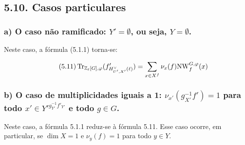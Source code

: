 \subsection*{5.10. Casos particulares}
\subsubsection*{a) O caso não ramificado: $Y' = \emptyset$, ou seja, $Y = \emptyset$.}

Neste caso, a fórmula (5.1.1) torna-se:

\begin{equation}\tag{5.11}
\operatorname{Tr}_{\mathbb Z_\ell[G],\varphi}(f'_{H^\vee_{U',X'}(\ell)}) = \sum_{x \in X^f} \nu_x(f) \mathrm{NW}_f^{G,\varphi}(x)
\end{equation}

\subsubsection*{b) O caso de multiplicidades iguais a 1: $\nu_{x'}(g_{X'}^{-1}f') = 1$ para todo $x'\in {Y'}^{g_{Y'}^{-1}f'_{Y'}}$ e todo $g\in G$.}

Neste caso, a fórmula 5.1.1 reduz-se à fórmula 5.11. Esse caso ocorre, em particular, se $\dim X = 1$ e $\nu_y(f)=1$ para todo $y\in Y$.%
